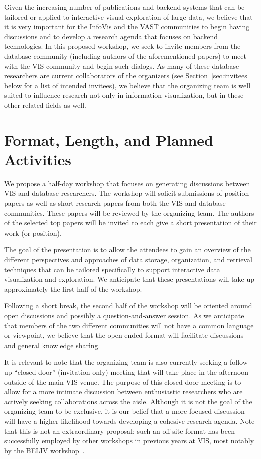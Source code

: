 \documentclass[journal]{vgtc}                %
\begin{document}
Given the increasing number of publications and backend systems that can be tailored or applied to interactive visual exploration of large data, we believe that it is very important for the InfoVis and the
VAST communities to begin having discussions and to develop a research agenda that focuses on backend technologies. 
In this proposed workshop, we seek to invite members from the database community (including authors of the aforementioned papers) to meet with the VIS community and begin such dialogs. 
As many of these database researchers are current collaborators of the organizers (see Section~\ref{sec:invitees} below for a list of intended invitees), we believe that the organizing team is well suited to influence research not only in information visualization, but in these other related fields as well.

\section{Format, Length, and Planned Activities}
We propose a half-day workshop that focuses on generating discussions between VIS and database researchers. 
The workshop will solicit submissions of position papers as well as short research papers from both the VIS and database communities. 
These papers will be reviewed by the organizing team. 
The authors of the selected top papers will be invited to each give a short presentation of their work (or position).

The goal of the presentation is to allow the attendees to gain an overview of the different perspectives and approaches of data storage, organization, and retrieval techniques that can be tailored specifically to support interactive data visualization and exploration. 
We anticipate that these presentations will take up approximately the first half of the workshop.

Following a short break, the second half of the workshop will be oriented around open discussions and possibly a question-and-answer session. 
As we anticipate that members of the two different communities will not have a common language or viewpoint, we believe that the open-ended format will facilitate discussions and general knowledge sharing.

It is relevant to note that the organizing team is also currently seeking a follow-up ``closed-door'' (invitation only) meeting that will take place in the afternoon outside of the main VIS venue. 
The purpose of this closed-door meeting is to allow for a more intimate discussion between enthusiastic researchers who are actively seeking collaborations across the aisle. 
Although it is not the goal of the organizing team to be exclusive, it is our belief that a more focused
discussion will have a higher likelihood towards developing a cohesive research agenda. 
Note that this is not an extraordinary proposal: such an off-site format has been successfully employed by other workshops in previous years at VIS, most notably by the BELIV workshop~.
\end{document}
